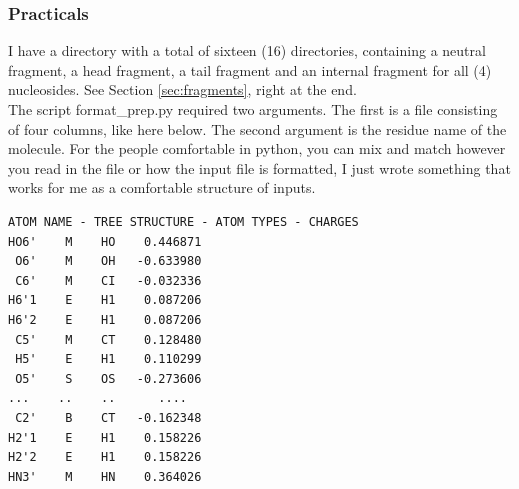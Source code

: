 \documentclass[a4paper]{article}
\begin{document}
\subsubsection{Practicals}
I have a directory with a total of sixteen (16) directories, containing a neutral fragment, a head fragment, a tail fragment and an internal fragment for all (4) nucleosides. See Section \ref{sec:fragments}, right at the end.\\
The script format\_prep.py required two arguments. The first is a file consisting of four columns, like here below. The second argument is the residue name of the molecule. For the people comfortable in python, you can mix and match however you read in the file or how the input file is formatted, I just wrote something that works for me as a comfortable structure of inputs.
\begin{tcolorbox}
\begin{verbatim}
ATOM NAME - TREE STRUCTURE - ATOM TYPES - CHARGES
HO6'    M    HO    0.446871                    
 O6'    M    OH   -0.633980       
 C6'    M    CI   -0.032336       
H6'1    E    H1    0.087206       
H6'2    E    H1    0.087206       
 C5'    M    CT    0.128480       
 H5'    E    H1    0.110299       
 O5'    S    OS   -0.273606       
...    ..    ..      ....
 C2'    B    CT   -0.162348       
H2'1    E    H1    0.158226       
H2'2    E    H1    0.158226       
HN3'    M    HN    0.364026       
\end{verbatim}
\end{tcolorbox}
\end{document}
